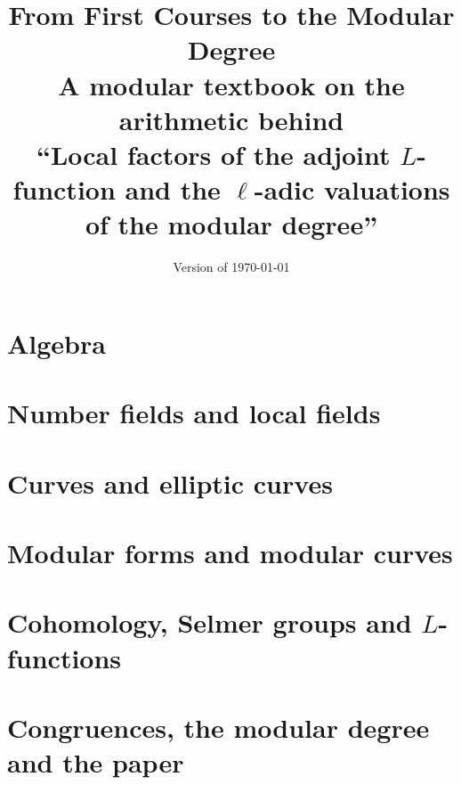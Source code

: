 \documentclass[11pt,twoside,openright]{book}
\title{From First Courses to the Modular Degree\\[1ex]
\large A modular textbook on the arithmetic behind\\
``Local factors of the adjoint $L$-function and the $\ell$-adic valuations of the modular degree''}
\author{}
\date{Version of \today}
\begin{document}
\frontmatter
\maketitle

\makeatletter\renewcommand{\@pnumwidth}{2.4em}\renewcommand{\@tocrmarg}{3.2em}\makeatother
\tableofcontents

\mainmatter

\part{Algebra}





\part{Number fields and local fields}




\part{Curves and elliptic curves}





\part{Modular forms and modular curves}





\part{Cohomology, Selmer groups and $L$-functions}





\part{Congruences, the modular degree and the paper}




\appendix



\backmatter


\end{document}
